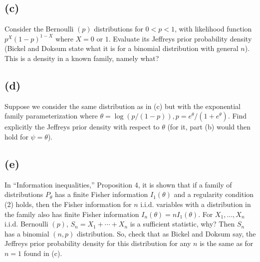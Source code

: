 \documentclass[11pt]{article}
\newcommand{\ProbS}{\iftrue}
\newcommand{\ProbE}{\fi}
\begin{document}
\subsection*{(c)}
\ProbS
Consider the Bernoulli $(p)$ distributions for $0<p<1$, with likelihood function $p^X(1-p)^{1-X}$ where $X=0$ or $1$. Evaluate its Jeffreys prior probability density (Bickel and Doksum state what it is for a binomial distribution with general $n$). This is a density in a known family, namely what?
\ProbE

\subsection*{(d)}
\ProbS
Suppose we consider the same distribution as in (c) but with the exponential family parameterization where $\theta = \log(p/(1-p)), p=e^{\theta}/(1+e^{\theta})$. Find explicitly the Jeffreys prior density with respect to $\theta$ (for it, part (b) would then hold for $\psi = \theta$).
\ProbE

\subsection*{(e)}
\ProbS
In ``Information inequalities,'' Proposition 4, it is shown that if a family of distributions $P_{\theta}$ has a finite Fisher information $I_1(\theta)$ and a regularity condition (2) holds, then the Fisher information for $n$ i.i.d. variables with a distribution in the family also has finite Fisher information $I_{n}(\theta) = nI_1(\theta)$.
For $X_1, \dots, X_n$ i.i.d. Bernoulli $(p)$, $S_n = X_1 + \cdots + X_n$ is a sufficient statistic, why?
Then $S_n$ has a binomial $(n, p)$ distribution. So, check that as Bickel and Doksum say, the Jeffreys prior probability density for this distribution for any $n$ is the same as for $n=1$ found in (c).
\ProbE
\end{document}
